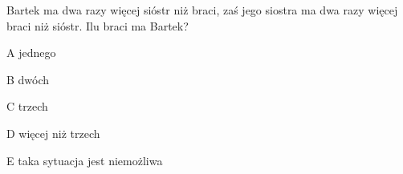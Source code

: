 \begin{tresc}
Bartek ma dwa razy więcej sióstr niż braci, zaś jego siostra ma dwa razy więcej braci niż sióstr. Ilu braci ma Bartek?
\end{tresc}
\begin{wariant}{A} jednego \end{wariant}
\begin{wariant}{B} dwóch \end{wariant}
\begin{wariant}{C} trzech \end{wariant}
\begin{wariant}{D} więcej niż trzech \end{wariant}
\begin{wariant}{E} taka sytuacja jest niemożliwa \end{wariant}

